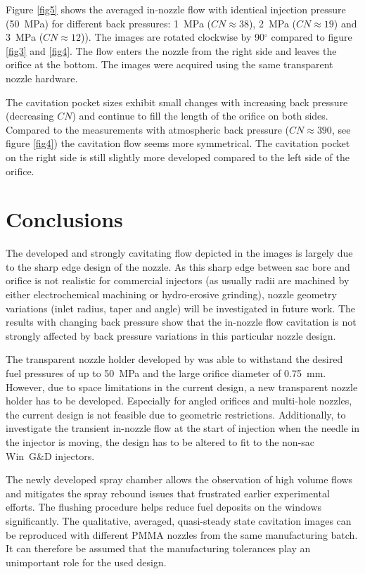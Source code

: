 \documentclass[letterpaper,twocolumn,10pt]{ilass}
\newcommand\CN{\ensuremath{\mathit{CN}}}
\begin{document}
%
Figure \ref{fig5} shows the averaged in-nozzle flow with identical injection pressure (50~MPa)
for different back pressures: 1~MPa ($\CN \approx 38$), 2~MPa ($\CN \approx 19$) and 3~MPa
($\CN \approx 12$)). The images are rotated clockwise by 90$^{\circ}$ compared to figure
\ref{fig3} and \ref{fig4}. The flow enters the nozzle from the right side and leaves the
orifice at the bottom. The images were acquired using the same transparent nozzle hardware.
%

The cavitation pocket sizes exhibit small changes with increasing back pressure
(decreasing $\CN$) and continue to fill the length of the orifice on both sides. Compared to the measurements with atmospheric back pressure ($\CN \approx 390$, see figure \ref{fig4}) the cavitation flow seems more symmetrical. The cavitation pocket on the right side is still slightly more developed compared to the left side of the orifice. 

%

\section*{Conclusions}
The developed and strongly cavitating flow depicted in the images is largely due to the
sharp edge design of the nozzle. As this sharp edge between sac bore and orifice is not
realistic for commercial injectors (as usually radii are machined by either electrochemical
machining or hydro-erosive grinding), nozzle geometry variations (inlet radius, taper and angle)
will be investigated in future work.
%
The results with changing back pressure show that the in-nozzle flow cavitation is not strongly affected by back pressure variations in this particular nozzle design.
%

The transparent nozzle holder developed by \cite{Falgout2015} was able to withstand the desired
fuel pressures of up to 50~MPa and the large orifice diameter of 0.75~mm. However, due to space
limitations in the current design, a new transparent nozzle holder has to be developed.
Especially for angled orifices and multi-hole nozzles, the current design is not feasible due
to geometric restrictions. Additionally, to investigate the transient in-nozzle flow at the
start of injection when the needle in the injector is moving, the design has to be altered to
fit to the non-sac Win~G\&D injectors.
%

The newly developed spray chamber allows the observation of high volume flows and mitigates
the spray rebound issues that frustrated earlier experimental efforts. The flushing procedure helps reduce fuel deposits on the windows significantly.
%
The qualitative, averaged, quasi-steady state cavitation images can be reproduced with different
PMMA nozzles from the same manufacturing batch. It can therefore be assumed that the
manufacturing tolerances play an unimportant role for the used design.
%
\end{document}
